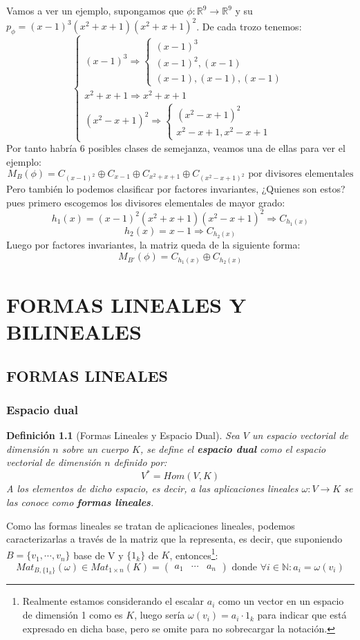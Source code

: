 \documentclass[10pt,a4paper,openright]{book}
\theoremstyle{break}
\newtheorem*{defi}{Definición}
\begin{document}
Vamos a ver un ejemplo, supongamos que $\phi: \mathbb R^9\rightarrow \mathbb R^9$ y su $p_\phi= (x-1)^3(x^2+x+1)(x^2+x+1)^2$. De cada trozo tenemos:
$$\begin{cases}(x-1)^3 \Rightarrow \begin{cases} (x-1)^3 \\ (x-1)^2, (x-1) \\ (x-1), (x-1), (x-1) \end{cases} \\ x^2+x+1 \Rightarrow x^2+x+1\\ (x^2-x+1)^2\Rightarrow \begin{cases}(x^2-x+1)^2 \\ x^2-x+1, x^2-x+1 \end{cases}\end{cases}$$
Por tanto habría 6 posibles clases de semejanza, veamos una de ellas para ver el ejemplo:
$$M_B(\phi)=C_{(x-1)^2}\oplus C_{x-1}\oplus C_{x^2+x+1}\oplus C_{(x^2-x+1)^2}\mbox{	 por divisores elementales}$$
Pero también lo podemos clasificar por factores invariantes, ¿Quienes son estos? pues primero escogemos los divisores elementales de mayor grado:
$$h_1(x)=(x-1)^2(x^2+x+1)(x^2-x+1)^2\Rightarrow C_{h_1(x)}$$
$$h_2(x)=x-1\Rightarrow C_{h_2(x)}$$
Luego por factores invariantes, la matriz queda de la siguiente forma:
$$M_{B'}(\phi)=C_{h_1(x)}\oplus C_{h_2(x)}$$

\chapter{FORMAS LINEALES Y \\BILINEALES}
\section{FORMAS LINEALES}
\subsection{Espacio dual}
\begin{defi}[Formas Lineales y Espacio Dual]
Sea $V$ un espacio vectorial de dimensión $n$ sobre un cuerpo $K$, se define el \textbf{espacio dual} como el espacio vectorial de dimensión $n$ definido por:
$$V^* = Hom(V,K)$$
A los elementos de dicho espacio, es decir, a las aplicaciones lineales $\omega: V\rightarrow K$ se las conoce como \textbf{formas lineales}.
\end{defi}
Como las formas lineales se tratan de aplicaciones lineales, podemos caracterizarlas a través de la matriz que la representa, es decir, que suponiendo $B = \{v_1, \cdots, v_n\}$ base de V y $\{1_k\}$ de $K$, entonces\footnote{Realmente estamos considerando el escalar $a_i$ como un vector en un espacio de dimensión 1 como es $K$, luego sería $\omega(v_i) = a_i \cdot 1_k$ para indicar que está expresado en dicha base, pero se omite para no sobrecargar la notación.}:
$$Mat_{B,\{1_k\}}(\omega)\in Mat_{1\times n}(K)=\begin{pmatrix} a_1 & \cdots & a_n \end{pmatrix} \mbox{ donde } \forall i \in \mathbb{N}: a_i = \omega (v_i)$$
\end{document}
